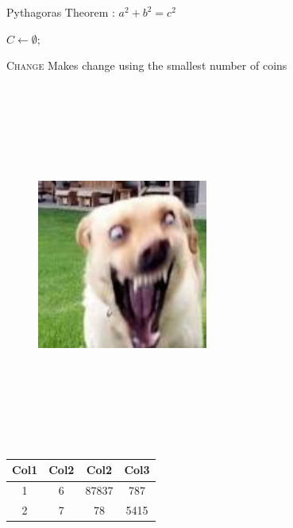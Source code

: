 \documentclass{IEEEtran}
\begin{document}
	
	
	\nocite{*}
	\vspace{2cm}
	Pythagoras Theorem : $a^2 + b^2 = c^2$
	\vspace{2cm}
	\begin{algorithm}
		$C \leftarrow \emptyset;$
		
		\caption{\textsc{Change} Makes change using the smallest number of coins}
	\end{algorithm}
	\vspace{2cm}
	\begin{figure}
		\includegraphics[width=0.5\textwidth,height=12cm]{doge.jpeg}
	\end{figure}
	\begin{tabular}{||c c c c||} 
		\hline
		Col1 & Col2 & Col2 & Col3 \\ [0.5ex] 
		\hline\hline
		1 & 6 & 87837 & 787 \\ 
		\hline
		2 & 7 & 78 & 5415 \\
		\hline
	\end{tabular}
\end{document}
